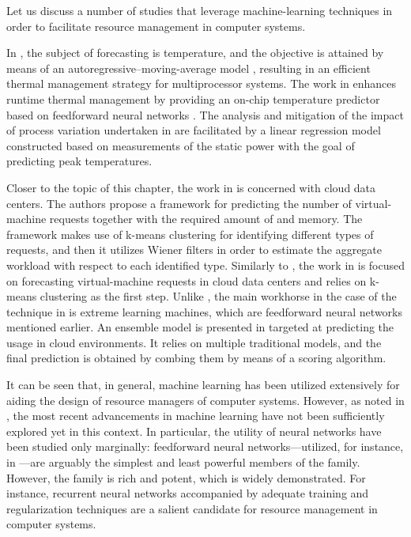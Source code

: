 Let us discuss a number of studies that leverage machine-learning techniques in
order to facilitate resource management in computer systems.

In \cite{coskun2008}, the subject of forecasting is temperature, and the
objective is attained by means of an autoregressive--moving-average model
\cite{hastie2013}, resulting in an efficient thermal management strategy for
multiprocessor systems. The work in \cite{kumar2010} enhances runtime thermal
management by providing an on-chip temperature predictor based on feedforward
neural networks \cite{hastie2013}. The analysis and mitigation of the impact of
process variation undertaken in \cite{juan2014} are facilitated by a linear
regression model \cite{hastie2013} constructed based on measurements of the
static power with the goal of predicting peak temperatures.

Closer to the topic of this chapter, the work in \cite{dabbagh2015} is concerned
with cloud data centers. The authors propose a framework for predicting the
number of virtual-machine requests together with the required amount of 
and memory. The framework makes use of k-means clustering \cite{hastie2013} for
identifying different types of requests, and then it utilizes Wiener filters in
order to estimate the aggregate workload with respect to each identified type.
Similarly to \cite{dabbagh2015}, the work in \cite{ismaeel2015} is focused on
forecasting virtual-machine requests in cloud data centers and relies on k-means
clustering as the first step. Unlike \cite{dabbagh2015}, the main workhorse in
the case of the technique in \cite{ismaeel2015} is extreme learning machines,
which are feedforward neural networks mentioned earlier. An ensemble model
\cite{hastie2013} is presented in \cite{cao2014} targeted at predicting the
 usage in cloud environments. It relies on multiple traditional models,
and the final prediction is obtained by combing them by means of a scoring
algorithm.

It can be seen that, in general, machine learning has been utilized extensively
for aiding the design of resource managers of computer systems. However, as
noted in , the most recent advancements in machine
learning have not been sufficiently explored yet in this context. In particular,
the utility of neural networks have been studied only marginally: feedforward
neural networks---utilized, for instance, in \cite{kumar2010, ismaeel2015}---are
arguably the simplest and least powerful members of the family. However, the
family is rich and potent, which is widely demonstrated. For instance, recurrent
neural networks accompanied by adequate training and regularization techniques
\cite{goodfellow2016} are a salient candidate for resource management in
computer systems.


